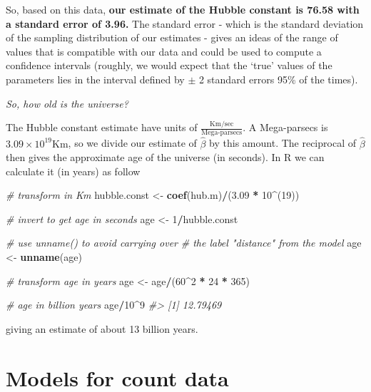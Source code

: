 \documentclass[
]{book}
\newenvironment{Shaded}{\begin{snugshade}}{\end{snugshade}}
\newcommand{\CommentTok}[1]{\textcolor[rgb]{0.56,0.35,0.01}{\textit{#1}}}
\newcommand{\DecValTok}[1]{\textcolor[rgb]{0.00,0.00,0.81}{#1}}
\newcommand{\FloatTok}[1]{\textcolor[rgb]{0.00,0.00,0.81}{#1}}
\newcommand{\FunctionTok}[1]{\textcolor[rgb]{0.13,0.29,0.53}{\textbf{#1}}}
\newcommand{\NormalTok}[1]{#1}
\newcommand{\OtherTok}[1]{\textcolor[rgb]{0.56,0.35,0.01}{#1}}
\newcommand{\SpecialCharTok}[1]{\textcolor[rgb]{0.81,0.36,0.00}{\textbf{#1}}}
\begin{document}
So, based on this data, \textbf{our estimate of the Hubble constant is 76.58 with a standard error of 3.96.} The standard error - which is the standard deviation of the sampling distribution of our estimates - gives an ideas of the range of values that is compatible with our data and could be used to compute a confidence intervals (roughly, we would expect that the `true' values of the parameters lies in the interval defined by \(\pm\) 2 standard errors 95\% of the times).

\emph{So, how old is the universe?}

The Hubble constant estimate have units of \(\frac{\text{Km}/\text{sec}}{\text{Mega-parsecs}}\). A Mega-parsecs is \(3.09 \times 10^{19} \text{Km}\), so we divide our estimate of \(\hat \beta\) by this amount. The reciprocal of \(\hat \beta\) then gives the approximate age of the universe (in seconds). In R we can calculate it (in years) as follow

\begin{Shaded}
\begin{Highlighting}[]
\CommentTok{\# transform in Km}
\NormalTok{hubble.const }\OtherTok{\textless{}{-}} \FunctionTok{coef}\NormalTok{(hub.m)}\SpecialCharTok{/}\NormalTok{(}\FloatTok{3.09} \SpecialCharTok{*} \DecValTok{10}\SpecialCharTok{\^{}}\NormalTok{(}\DecValTok{19}\NormalTok{))}

\CommentTok{\# invert to get age in seconds}
\NormalTok{age }\OtherTok{\textless{}{-}} \DecValTok{1}\SpecialCharTok{/}\NormalTok{hubble.const}

\CommentTok{\# use unname() to avoid carrying over }
\CommentTok{\# the label "distance" from the model}
\NormalTok{age }\OtherTok{\textless{}{-}} \FunctionTok{unname}\NormalTok{(age)}

\CommentTok{\# transform age in years}
\NormalTok{age }\OtherTok{\textless{}{-}}\NormalTok{ age}\SpecialCharTok{/}\NormalTok{(}\DecValTok{60}\SpecialCharTok{\^{}}\DecValTok{2} \SpecialCharTok{*} \DecValTok{24} \SpecialCharTok{*} \DecValTok{365}\NormalTok{)}

\CommentTok{\# age in billion years}
\NormalTok{age}\SpecialCharTok{/}\DecValTok{10}\SpecialCharTok{\^{}}\DecValTok{9}
\CommentTok{\#\textgreater{} [1] 12.79469}
\end{Highlighting}
\end{Shaded}

giving an estimate of about 13 billion years.

\chapter{Models for count data}\label{count-data}
\end{document}
